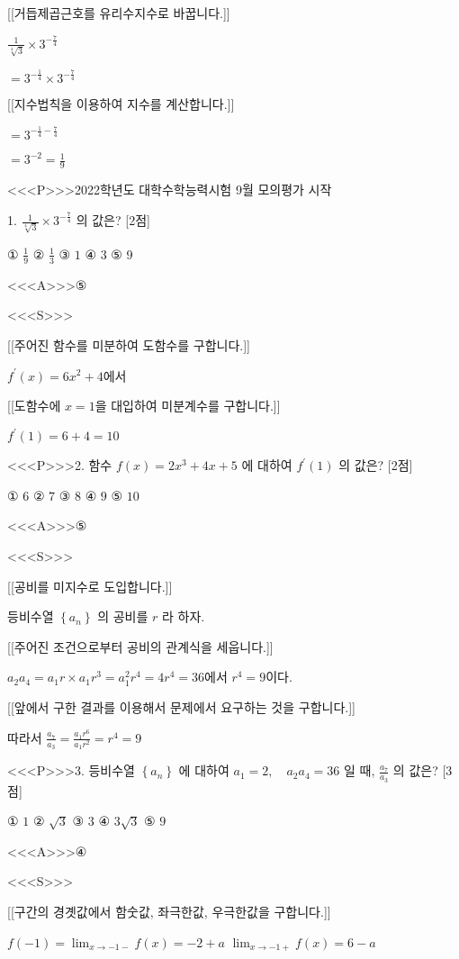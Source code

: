 \documentclass{oblivoir}
\begin{document}
[[거듭제곱근호를 유리수지수로 바꿉니다.]]

$\frac{1}{\sqrt[4]{3}} \times 3^{-\frac{7}{4}}$

$=3^{-\frac{1}{4}} \times 3^{-\frac{7}{4}}$

[[지수법칙을 이용하여 지수를 계산합니다.]]

$=3^{-\frac{1}{4}-\frac{7}{4}}$

$=3^{-2}=\frac{1}{9}$

<<<P>>>2022학년도 대학수학능력시험 9월 모의평가 시작

1. $\frac{1}{\sqrt[4]{3}} \times 3^{-\frac{7}{4}}$ 의 값은? [2점]

① $\frac{1}{9}$
② $\frac{1}{3}$
③ $1$
④ $3$
⑤ $9$


<<<A>>>⑤

<<<S>>>

[[주어진 함수를 미분하여 도함수를 구합니다.]]

$ f^{\prime}(x)=6 x^{2}+4$에서

[[도함수에 $x=1$을 대입하여 미분계수를 구합니다.]]

$f^{\prime}(1)=6+4=10$


<<<P>>>2. 함수 $f(x)=2 x^{3}+4 x+5$ 에 대하여 $f^{\prime}(1)$ 의 값은? [2점]

① $6$
② $7$
③ $8$
④ $9$
⑤ $10$

<<<A>>>⑤

<<<S>>>

[[공비를 미지수로 도입합니다.]]

등비수열 $\left\{a_{n}\right\}$ 의 공비를 $r$ 라 하자.

[[주어진 조건으로부터 공비의 관계식을 세웁니다.]]

$a_{2} a_{4}=a_{1} r \times a_{1} r^{3}=a_{1}^{2} r^{4}=4 r^{4}=36$에서 $r^{4}=9$이다.

[[앞에서 구한 결과를 이용해서 문제에서 요구하는 것을 구합니다.]]

따라서 $\frac{a_{7}}{a_{3}}=\frac{a_{1} r^{6}}{a_{1} r^{2}}=r^{4}=9$


<<<P>>>3. 등비수열 $\left\{a_{n}\right\}$ 에 대하여 $a_{1}=2, \quad a_{2} a_{4}=36$ 일 때, $\frac{a_{7}}{a_{3}}$ 의 값은? [3점]

① $1$
② $\sqrt{3}$
③ $3$
④ $3 \sqrt{3}$
⑤ $9$

<<<A>>>④

<<<S>>>

[[구간의 경곗값에서 함숫값, 좌극한값, 우극한값을 구합니다.]]

$ f(-1)=\lim _{x \rightarrow-1-} f(x)=-2+a$
$\lim _{x \rightarrow-1+} f(x)=6-a$
\end{document}
